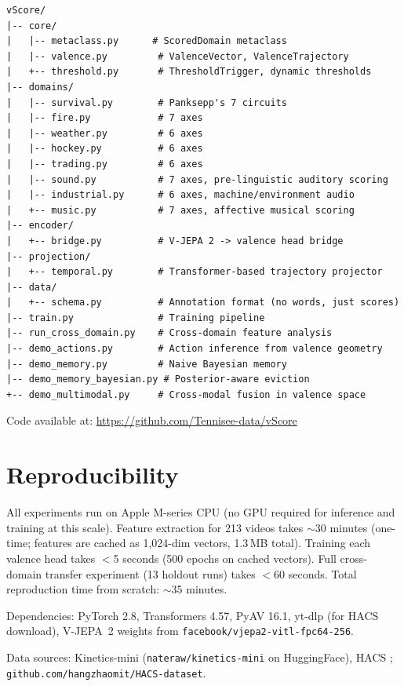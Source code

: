 \documentclass[11pt]{article}
\begin{document}
\begin{lstlisting}[language={}]
vScore/
|-- core/
|   |-- metaclass.py      # ScoredDomain metaclass
|   |-- valence.py         # ValenceVector, ValenceTrajectory
|   +-- threshold.py       # ThresholdTrigger, dynamic thresholds
|-- domains/
|   |-- survival.py        # Panksepp's 7 circuits
|   |-- fire.py            # 7 axes
|   |-- weather.py         # 6 axes
|   |-- hockey.py          # 6 axes
|   |-- trading.py         # 6 axes
|   |-- sound.py           # 7 axes, pre-linguistic auditory scoring
|   |-- industrial.py      # 6 axes, machine/environment audio
|   +-- music.py           # 7 axes, affective musical scoring
|-- encoder/
|   +-- bridge.py          # V-JEPA 2 -> valence head bridge
|-- projection/
|   +-- temporal.py        # Transformer-based trajectory projector
|-- data/
|   +-- schema.py          # Annotation format (no words, just scores)
|-- train.py               # Training pipeline
|-- run_cross_domain.py    # Cross-domain feature analysis
|-- demo_actions.py        # Action inference from valence geometry
|-- demo_memory.py         # Naive Bayesian memory
|-- demo_memory_bayesian.py # Posterior-aware eviction
+-- demo_multimodal.py     # Cross-modal fusion in valence space
\end{lstlisting}

Code available at: \url{https://github.com/Tennisee-data/vScore}

\section{Reproducibility}

All experiments run on Apple M-series CPU (no GPU required for inference and training at this scale). Feature extraction for 213 videos takes $\sim$30 minutes (one-time; features are cached as 1{,}024-dim vectors, 1.3\,MB total). Training each valence head takes $<$5 seconds (500 epochs on cached vectors). Full cross-domain transfer experiment (13 holdout runs) takes $<$60 seconds. Total reproduction time from scratch: $\sim$35 minutes.

Dependencies: PyTorch 2.8, Transformers 4.57, PyAV 16.1, yt-dlp (for HACS download), V-JEPA~2 weights from \texttt{facebook/vjepa2-vitl-fpc64-256}.

Data sources: Kinetics-mini (\texttt{nateraw/kinetics-mini} on HuggingFace), HACS \citep{zhao2019}; \texttt{github.com/hangzhaomit/HACS-dataset}.
\end{document}
